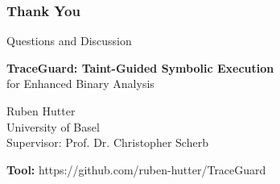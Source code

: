 \documentclass[aspectratio=169]{beamer}
\begin{document}
\begin{frame}
    \frametitle{Thank You}
    \begin{center}
        \Large Questions and Discussion
        
        \vspace{2em}
        \normalsize
        \textbf{TraceGuard: Taint-Guided Symbolic Execution} \\
        for Enhanced Binary Analysis
        
        \vspace{1em}
        Ruben Hutter \\
        University of Basel \\
        Supervisor: Prof. Dr. Christopher Scherb
        
        \vspace{2em}
        \textbf{Tool:} https://github.com/ruben-hutter/TraceGuard
    \end{center}
\end{frame}
\end{document}
